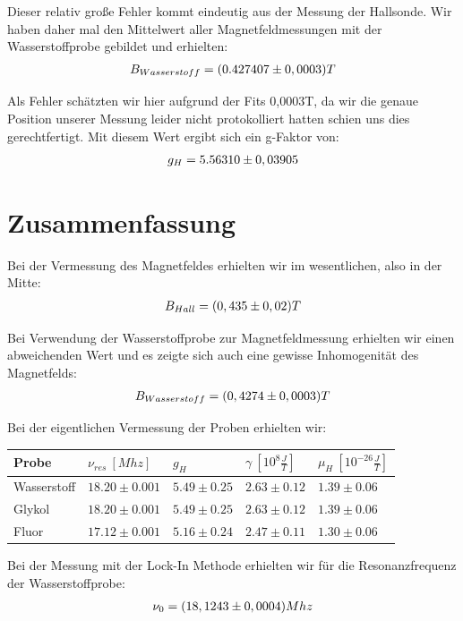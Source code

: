 \documentclass[12pt]{article}
\begin{document}
Dieser relativ große Fehler kommt eindeutig aus der Messung der Hallsonde. Wir haben daher mal den Mittelwert aller Magnetfeldmessungen mit der Wasserstoffprobe gebildet und erhielten:
\begin{align}
  \notag B_{Wasserstoff}= (0.427407 \pm 0,0003) T
\end{align}

Als Fehler schätzten wir hier aufgrund der Fits 0,0003T, da wir die genaue Position unserer Messung leider nicht protokolliert hatten schien uns dies gerechtfertigt. Mit diesem Wert ergibt sich ein g-Faktor von:
\begin{align}
 \notag g_H =  5.56310 \pm  0,03905
\end{align}
\newpage

\section{Zusammenfassung}

Bei der Vermessung des Magnetfeldes erhielten wir im wesentlichen, also in der Mitte:
\begin{align}
 \notag B_{Hall}=(0,435 \pm 0,02) T
\end{align}

Bei Verwendung der Wasserstoffprobe zur Magnetfeldmessung erhielten wir einen abweichenden Wert und es zeigte sich auch eine gewisse Inhomogenität des Magnetfelds:
\begin{align}
 \notag B_{Wasserstoff}=(0,4274 \pm 0,0003) T
\end{align}

Bei der eigentlichen Vermessung der Proben erhielten wir:
\begin{center}
\begin{tabular}{|l|llll|}
\hline
Probe & $\nu_{res}~[Mhz]$ & $g_H$ & $\gamma~[10^8\frac{J}{T}]$ & $\mu_H~[10^{-26}\frac{J}{T}]$ \\ 
\hline
Wasserstoff & $18.20\pm0.001$ & $5.49\pm0.25$ & $2.63\pm0.12$ & $1.39\pm0.06$ \\ 
Glykol & $18.20\pm0.001$ & $5.49\pm0.25$ & $2.63\pm0.12$ & $1.39\pm0.06$ \\ 
Fluor & $17.12\pm0.001$ & $5.16\pm0.24$ & $2.47\pm0.11$ & $1.30\pm0.06$ \\
\hline
\end{tabular}
\end{center}

Bei der Messung mit der Lock-In Methode erhielten wir für die Resonanzfrequenz der Wasserstoffprobe:
\begin{align}
 \notag \nu_0= (18,1243\pm0,0004)Mhz
\end{align}
\end{document}
